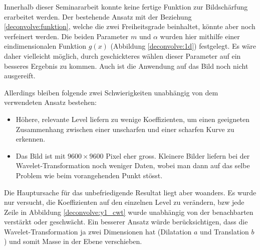 Innerhalb dieser Seminararbeit konnte keine fertige Funktion zur Bildschärfung erarbeitet werden.
Der bestehende Ansatz mit der Beziehung \eqref{deconvolve:funktion}, welche die zwei Freiheitsgrade beinhaltet, könnte aber noch verfeinert werden.
Die beiden Parameter $m$ und $\alpha$ wurden hier mithilfe einer eindimensionalen Funktion $g(x)$ (Abbildung \ref{deconvolve:1d}) festgelegt.
Es wäre daher vielleicht möglich, durch geschickteres wählen dieser Parameter auf ein besseres Ergebnis zu kommen.
Auch ist die Anwendung auf das Bild noch nicht ausgereift.

Allerdings bleiben folgende zwei Schwierigkeiten unabhängig von dem verwendeten Ansatz bestehen:
\begin{itemize}
	\item Höhere, relevante Level liefern zu wenige Koeffizienten, um einen geeigneten Zusammenhang zwischen einer unscharfen und einer scharfen Kurve zu erkennen.
	\item Das Bild ist mit $9600\times9600$ Pixel eher gross. Kleinere Bilder liefern bei der Wavelet-Transformation noch weniger Daten, wobei man dann auf das selbe Problem wie beim vorangehenden Punkt stösst.
\end{itemize}

Die Hauptursache für das unbefriedigende Resultat liegt aber woanders.
Es wurde nur versucht, die Koeffizienten auf den einzelnen Level zu verändern, bzw jede Zeile in Abbildung \ref{deconvolve:y1_cwt} wurde unabhängig von der benachbarten verstärkt oder geschwächt.
Ein besserer Ansatz würde berücksichtigen, dass die Wavelet-Transformation ja zwei Dimensionen hat (Dilatation $a$ und Translation $b$) und somit \glqq Masse \grqq{} in der Ebene verschieben.

